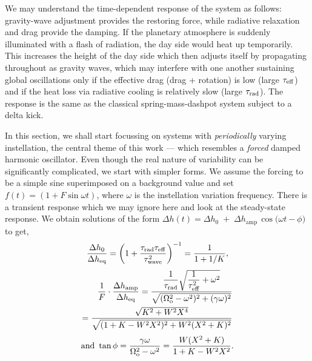 \documentclass[trackchanges,twocolumn]{aastex7}
\begin{document}
We may understand the time-dependent response of the system as follows: gravity-wave adjustment provides the restoring force, while radiative relaxation and drag provide the damping. If the planetary atmosphere is suddenly illuminated with a flash of radiation, the day side would heat up temporarily. This increases the height of the day side which then adjusts itself by propagating throughout as gravity waves, which may interfere with one another sustaining global oscillations only if the effective drag (drag + rotation) is low (large $\tau_{\rm eff}$) and if the heat loss via radiative cooling is relatively slow (large $\tau_{\rm rad}$). The response is the same as the classical spring-mass-dashpot system subject to a delta kick.

In this section, we shall start focussing on systems with \textit{periodically} varying instellation, the central theme of this work --- which resembles a \textit{forced} damped harmonic oscillator. Even though the real nature of variability can be significantly complicated, we start with simpler forms. We assume the forcing to be a simple sine superimposed on a background value and set $f(t) = (1 + F\sin \omega t)$, where $\omega$ is the instellation variation frequency. There is a transient response which we may ignore here  and look at the steady-state response. We obtain solutions of the form
$
   \Delta h(t) = \Delta h_{0} \;+\;  \Delta h_{\mathrm{amp}}\,\cos\bigl(\omega t - \phi\bigr)
    \label{eq:case3_alt_ansatz}
$
to get,
\begin{equation}
    \frac{\Delta h_0}{\Delta h_{\mathrm{eq}}}
    = \left(1 + \dfrac{\tau_{\rm rad} \tau_{\rm eff}}{\tau_{\rm wave}^2}\right)^{-1} = \frac{1}{1+1/K},
    \label{eq:so_mean}
\end{equation}
\begin{align}
   \frac{1}{F} \cdot \frac{\Delta h_{\mathrm{amp}}}{\Delta h_{\mathrm{eq}}}  = \frac{\dfrac{1}{\tau_{\text{rad}}} \sqrt{\dfrac{1}{\tau_{\text{eff}}^2} + \omega^2}}{\sqrt{(\Omega_{\rm o}^2 - \omega^2)^2 + (\gamma \omega)^2}}  \nonumber \\ = \frac{\sqrt{K^2 + W^2 X^4}}{\sqrt{(1 + K - W^2 X^2)^2 + W^2 (X^2 + K)^2}}
   \label{eq:so_amp}
\end{align}
\begin{equation}
    \text{and } \tan \phi = \frac{\gamma \omega}{\Omega_{\rm o}^2 - \omega^2} =  \frac{W(X^2 + K)}{1 + K - W^2 X^2}.
    \label{eq:so_phase}
\end{equation}
\end{document}
